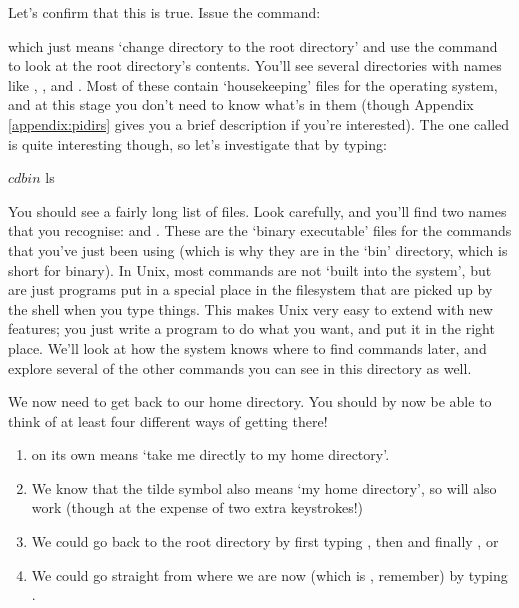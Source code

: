 Let's confirm that this is true. Issue the command:


which just means `change directory to the root directory' and use the  command to look at the root directory's contents. You'll see several directories with names like , ,  and . Most of these contain `housekeeping' files for the operating system, and at this stage you don't need to know what's in them (though Appendix \ref{appendix:pidirs} gives you a brief description if you're interested). The one called  is quite interesting though, so let's investigate that by typing: 

\begin{ttoutenv}
$ cd bin
$ ls
\end{ttoutenv}

\noindent You should see a fairly long list of files. Look carefully, and you'll find two names that you recognise:  and . These are the `binary executable' files for the commands that you've just been using (which is why they are in the `bin' directory, which is short for binary). In Unix, most commands are not `built into the system', but are just programs put in a special place in the filesystem that are picked up by the shell when you type things. This makes Unix very easy to extend with new features; you just write a program to do what you want, and put it in the right place. We'll look at how the system knows where to find commands later, and explore several of the other commands you can see in this directory as well. 

We now need to get back to our home directory. You should by now be able to think of at least four different ways of getting there!

\begin{enumerate}
\item {} on its own means `take me directly to my home directory'.
\item We know that the tilde symbol also means `my home directory', so  will also work (though at the expense of two extra keystrokes!)
\item We could go back to the root directory by first typing , then  and finally , or 
\item We could go straight from where we are now (which is , remember) by typing . 
\end{enumerate}

